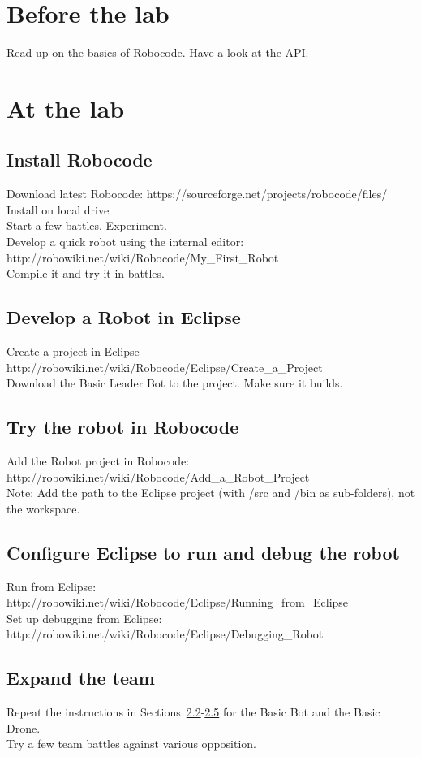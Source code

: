 \documentclass{scrreprt}
\begin{document}
\chapter{Before the lab}
Read up on the basics of Robocode.
Have a look at the API.

\chapter{At the lab}

\section{Install Robocode}
Download latest Robocode: https://sourceforge.net/projects/robocode/files/\\
Install on local drive\\
Start a few battles. Experiment.\\
Develop a quick robot using the internal editor: http://robowiki.net/wiki/Robocode/My_First_Robot\\
Compile it and try it in battles.

\section{Develop a Robot in Eclipse} \label{sec:develop}
Create a project in Eclipse http://robowiki.net/wiki/Robocode/Eclipse/Create_a_Project\\
Download the Basic Leader Bot to the project. Make sure it builds.

\section{Try the robot in Robocode} \label{sec:try}
Add the Robot project in Robocode: http://robowiki.net/wiki/Robocode/Add_a_Robot_Project\\
Note: Add the path to the Eclipse project (with /src and /bin as sub-folders), not the workspace.

\section{Configure Eclipse to run and debug the robot}
Run from Eclipse: http://robowiki.net/wiki/Robocode/Eclipse/Running_from_Eclipse\\
Set up debugging from Eclipse: http://robowiki.net/wiki/Robocode/Eclipse/Debugging_Robot

\section{Expand the team} \label{sec:expand}
Repeat the instructions in Sections~\ref{sec:develop}-\ref{sec:expand} for the Basic Bot and the Basic Drone.\\
Try a few team battles against various opposition.
\end{document}
